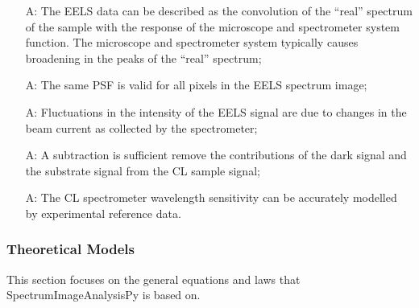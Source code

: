 \documentclass[12pt]{article}
\newcounter{assumpnum} %
\newcommand{\progname}{SpectrumImageAnalysisPy} %
\begin{document}
\begin{itemize}

	\item[A\refstepcounter{assumpnum}\theassumpnum \label{EELS_System_Response}:] The EELS data can be described as the convolution of the ``real'' spectrum of the sample with the response of the microscope and spectrometer system function. The microscope and spectrometer system typically causes broadening in the peaks of the ``real'' spectrum;
	
	\item[A\refstepcounter{assumpnum}\theassumpnum \label{EELS_PSF_variability}:] The same PSF is valid for all pixels in the EELS spectrum image;
	
	\item[A\refstepcounter{assumpnum}\theassumpnum \label{EELS_Intensity_Fluctuations}:] Fluctuations in the intensity of the EELS signal are due to changes in the beam current as collected by the spectrometer;
	
	\item[A\refstepcounter{assumpnum}\theassumpnum \label{CL_Background}:] A subtraction is sufficient remove the contributions of the dark signal and the substrate signal from the CL sample signal;
	
	\item[A\refstepcounter{assumpnum}\theassumpnum \label{CL_System_Response}:] The CL spectrometer wavelength sensitivity can be accurately modelled by experimental reference data.

\end{itemize}

\subsubsection{Theoretical Models}\label{sec_theoretical}

This section focuses on the general equations and laws that \progname{} is based
on.  

~\newline
\end{document}
